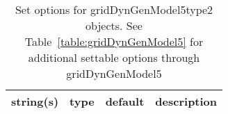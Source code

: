 \begin{table}[ht]
\centering
\begin{tabular}{p{5cm} c c p{7cm}}
\hline
string(s) & type & default & description \\
\hline
\hline
\end{tabular}
\caption{Set options for gridDynGenModel5type2 objects. See Table~\ref{table:gridDynGenModel5} for additional settable options through gridDynGenModel5}
\label{table:gridDynGenModel5type2}
\end{table}

